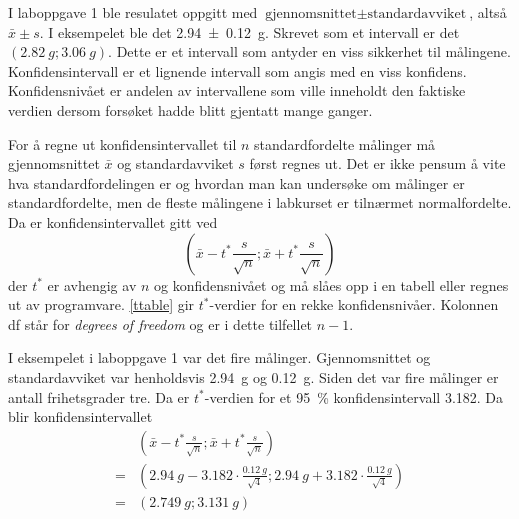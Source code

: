 	I laboppgave 1 ble resulatet oppgitt med $\text{gjennomsnittet} \pm \text{standardavviket}$, altså $\bar{x}\pm s$. I eksempelet ble det \SI[separate-uncertainty=true]{2.94 +- 0.12}{g}. Skrevet som et intervall er det $(\SI{2.82}{g}; \SI{3.06}{g})$. Dette er et intervall som antyder en viss sikkerhet til målingene. Konfidensintervall er et lignende intervall som angis med en viss konfidens. Konfidensnivået er andelen av intervallene som ville inneholdt den faktiske verdien dersom forsøket hadde blitt gjentatt mange ganger.
	
	For å regne ut konfidensintervallet til $n$ standardfordelte målinger må gjennomsnittet $\bar{x}$ og standardavviket $s$ først regnes ut. Det er ikke pensum å vite hva standardfordelingen er og hvordan man kan undersøke om målinger er standardfordelte, men de fleste målingene i labkurset er tilnærmet normalfordelte. Da er konfidensintervallet gitt ved
	\begin{equation*}
		\left(\bar{x}-t^*\frac{s}{\sqrt{n}}; \bar{x}+t^*\frac{s}{\sqrt{n}}\right)
	\end{equation*}
	der $t^*$ er avhengig av $n$ og konfidensnivået og må slåes opp i en tabell eller regnes ut av programvare. \vref{ttable} gir $t^*$-verdier for en rekke konfidensnivåer. Kolonnen df står for \emph{degrees of freedom} og er i dette tilfellet $n-1$. 
	
	I eksempelet i laboppgave 1 var det fire målinger. Gjennomsnittet og standardavviket var henholdsvis \SI{2.94}{g} og \SI{0.12}{g}. Siden det var fire målinger er antall frihetsgrader tre. Da er $t^*$-verdien for et \SI{95}{\percent} konfidensintervall \num{3.182}. Da blir konfidensintervallet
	\begin{align*}
		&\left(\bar{x}-t^*\frac{s}{\sqrt{n}}; \bar{x}+t^*\frac{s}{\sqrt{n}}\right)\\
		=&\left(\SI{2.94}{g}-\num{3.182}\cdot\frac{\SI{0.12}{g}}{\sqrt{4}}; \SI{2.94}{g}+\num{3.182}\cdot\frac{\SI{0.12}{g}}{\sqrt{4}}\right)\\
		=&\left(\SI{2.749}{g}; \SI{3.131}{g}\right)
	\end{align*} 
	
